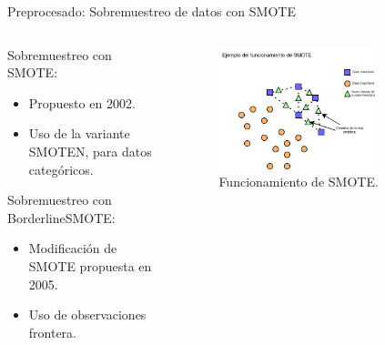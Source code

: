 \documentclass{beamer}
\begin{document}
\begin{frame}{Preprocesado: Sobremuestreo de datos con SMOTE}

	\begin{columns}[T]
		\begin{column}{.5\textwidth}
			Sobremuestreo con SMOTE:

			\begin{itemize}
				\item Propuesto en 2002.
				\item Uso de la variante SMOTEN, para datos categóricos.
			\end{itemize}

			\vspace{1cm}

			Sobremuestreo con BorderlineSMOTE:

			\begin{itemize}
				\item Modificación de SMOTE propuesta en 2005.
				\item Uso de observaciones frontera.
			\end{itemize}

		\end{column}

		\begin{column}{.5\textwidth}
			\vspace*{-0.5cm}
			\begin{figure}[H]
			    \centering
				 \includegraphics[width=0.75\textwidth]{funcionamiento_smote.png}
			    \caption{Funcionamiento de SMOTE.}
				 \label{fig:funcionamiento_smote}
			\end{figure}


\end{column}
\end{columns}
\end{frame}
\end{document}
